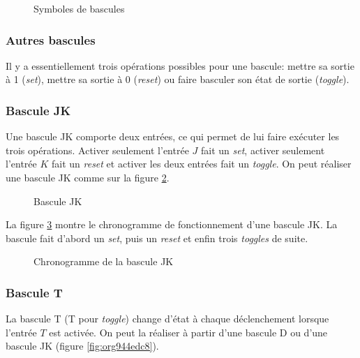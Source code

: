 \documentclass[11pt]{article}
\begin{document}
\begin{figure}[htbp]
\centering

\caption{\label{fig:org1a927a4}Symboles de bascules}
\end{figure}

\subsubsection{Autres bascules}
\label{sec:orgd859b6a}

Il y a essentiellement trois opérations possibles pour une bascule:
mettre sa sortie à 1 (\emph{set}), mettre sa sortie à 0 (\emph{reset}) ou faire
basculer son état de sortie (\emph{toggle}).

\subsubsection{Bascule JK}
\label{sec:org5520393}

Une bascule JK comporte deux entrées, ce qui permet de lui faire
exécuter les trois opérations. Activer seulement l'entrée \(J\) fait
un \emph{set}, activer seulement l'entrée \(K\) fait un \emph{reset} et activer
les deux entrées fait un \emph{toggle}. On peut réaliser une bascule JK
comme sur la figure \ref{fig:orgac1f8f0}.

\begin{figure}[htbp]
\centering

\caption{\label{fig:orgac1f8f0}Bascule JK}
\end{figure}

La figure \ref{fig:org88e78d7} montre le chronogramme de fonctionnement
d'une bascule JK. La bascule fait d'abord un \emph{set}, puis un \emph{reset} et
enfin trois \emph{toggles} de suite.

\begin{figure}[htbp]
\centering

\caption{\label{fig:org88e78d7}Chronogramme de la bascule JK}
\end{figure}

\subsubsection{Bascule T}
\label{sec:orgca6b7bf}

La bascule T (T pour \emph{toggle}) change d'état à chaque déclenchement
lorsque l'entrée \(T\) est activée. On peut la réaliser à partir d'une
bascule D ou d'une bascule JK (figure \ref{fig:org944edc8}).
\end{document}
